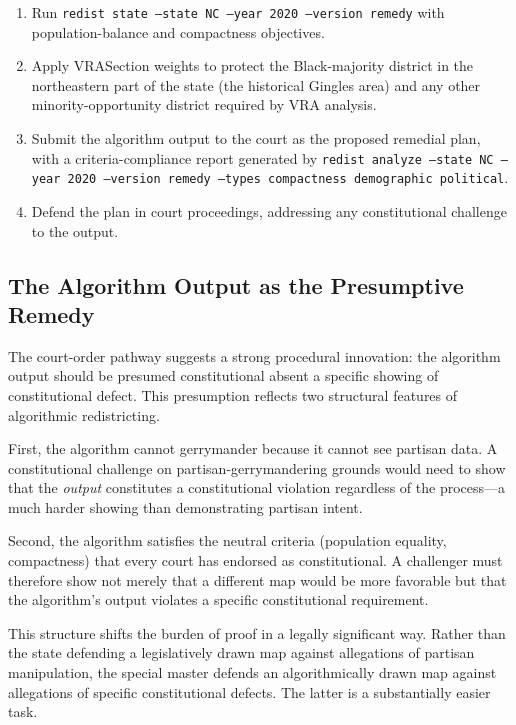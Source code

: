\begin{enumerate}
  \item Run \texttt{redist state --state NC --year 2020 --version remedy}
    with population-balance and compactness objectives.
  \item Apply VRASection weights to protect the Black-majority district
    in the northeastern part of the state (the historical Gingles area)
    and any other minority-opportunity district required by VRA analysis.
  \item Submit the algorithm output to the court as the proposed remedial
    plan, with a criteria-compliance report generated by
    \texttt{redist analyze --state NC --year 2020 --version remedy
    --types compactness demographic political}.
  \item Defend the plan in court proceedings, addressing any constitutional
    challenge to the output.
\end{enumerate}

\subsection{The Algorithm Output as the Presumptive Remedy}

The court-order pathway suggests a strong procedural innovation: the algorithm
output should be presumed constitutional absent a specific showing of
constitutional defect.  This presumption reflects two structural features
of algorithmic redistricting.

First, the algorithm cannot gerrymander because it cannot see partisan data.
A constitutional challenge on partisan-gerrymandering grounds would need to
show that the \emph{output} constitutes a constitutional violation regardless
of the process---a much harder showing than demonstrating partisan intent.

Second, the algorithm satisfies the neutral criteria (population equality,
compactness) that every court has endorsed as constitutional.  A challenger
must therefore show not merely that a different map would be more favorable
but that the algorithm's output violates a specific constitutional requirement.

This structure shifts the burden of proof in a legally significant way.
Rather than the state defending a legislatively drawn map against allegations
of partisan manipulation, the special master defends an algorithmically drawn
map against allegations of specific constitutional defects.  The latter is a
substantially easier task.

